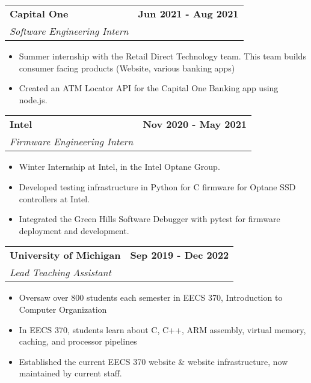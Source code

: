 \documentclass[11pt]{extreport}
\makeatletter
\newcommand{\resumeSubheading}[4]{
  \vspace{-1pt}
    \begin{tabular*}{1.0\textwidth}{l@{\extracolsep{\fill}}r}
      \textbf{#1} & \textbf{#2}  \vspace{1mm} \\
      {#3} & \textbf{#4} \\
    \end{tabular*}\vspace{-3pt}
}
\makeatother
\begin{document}
    \resumeSubheading{Capital One}{Jun 2021 - Aug 2021}
    {\textit{Software Engineering Intern}}{}
    \vspace{-3mm}
    \begin{itemize}
    \item[\textperiodcentered] Summer internship with the Retail Direct Technology team. This team builds consumer facing products (Website, various banking apps)
    \vspace{-1mm}
    \item[\textperiodcentered] Created an ATM Locator API for the Capital One Banking app using node.js.
    \vspace{-1mm}
    \end{itemize}
    
    \resumeSubheading{Intel}{Nov 2020 - May 2021}
    {\textit{Firmware Engineering Intern}}{}
    \vspace{-3mm}
    \begin{itemize}
     \item[\textperiodcentered] Winter Internship at Intel, in the Intel Optane Group. 
     \vspace{-1mm}
    \vspace{-1mm}\item[\textperiodcentered] Developed testing infrastructure in Python for C firmware for Optane SSD controllers at Intel.
    \vspace{-1mm}\item[\textperiodcentered] Integrated the Green Hills Software Debugger with pytest for firmware deployment and development.
    \end{itemize}
    
    \resumeSubheading{University of Michigan}{Sep 2019 - Dec 2022}
    {\textit{Lead Teaching Assistant}}{}
    \vspace{-3mm}
    \begin{itemize}
    \item[\textperiodcentered] Oversaw over 800 students each semester in EECS 370, Introduction to Computer Organization
    \vspace{-1mm}
    \item[\textperiodcentered] In EECS 370, students learn 
    about C, C++, ARM assembly, virtual memory, caching, and processor pipelines
    \vspace{-1mm}
    \item[\textperiodcentered] Established the current EECS 370 website \& website infrastructure, now maintained by current staff.
    \vspace{-1mm}
    \end{itemize}
\end{document}
